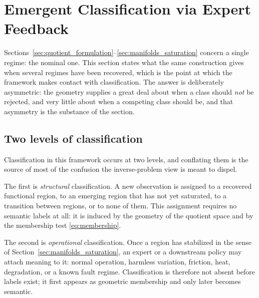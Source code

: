 \documentclass[a4paper]{cas-sc}
\begin{document}
\section{Emergent Classification via Expert Feedback}
\label{sec:emergent_classification}

Sections~\ref{sec:quotient_formulation}--\ref{sec:manifolds_saturation}
concern a single regime: the nominal one. This section states what the same
construction gives when several regimes have been recovered, which is the
point at which the framework makes contact with classification. The answer is
deliberately asymmetric: the geometry supplies a great deal about when a class
should \emph{not} be rejected, and very little about when a competing class
should be, and that asymmetry is the substance of the section.

\subsection{Two levels of classification}
\label{subsec:two_levels}

Classification in this framework occurs at two levels, and conflating them is
the source of most of the confusion the inverse-problem view is meant to
dispel.

The first is \emph{structural} classification. A new observation is assigned
to a recovered functional region, to an emerging region that has not yet
saturated, to a transition between regions, or to none of them. This
assignment requires no semantic labels at all: it is induced by the geometry
of the quotient space and by the membership test \eqref{eq:membership}.

The second is \emph{operational} classification. Once a region has stabilized
in the sense of Section~\ref{sec:manifolds_saturation}, an expert or a
downstream policy may attach meaning to it: normal operation, harmless
variation, friction, heat, degradation, or a known fault regime. Classification
is therefore not absent before labels exist; it first appears as geometric
membership and only later becomes semantic.
\end{document}
